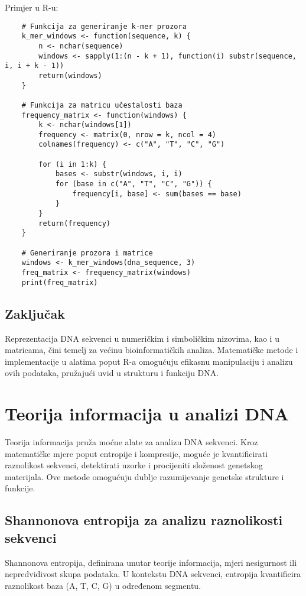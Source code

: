 \documentclass[10pt,a4paper,twoside]{article}
\begin{document}
Primjer u R-u:
\begin{verbatim}
	# Funkcija za generiranje k-mer prozora
	k_mer_windows <- function(sequence, k) {
		n <- nchar(sequence)
		windows <- sapply(1:(n - k + 1), function(i) substr(sequence, i, i + k - 1))
		return(windows)
	}
	
	# Funkcija za matricu učestalosti baza
	frequency_matrix <- function(windows) {
		k <- nchar(windows[1])
		frequency <- matrix(0, nrow = k, ncol = 4)
		colnames(frequency) <- c("A", "T", "C", "G")
		
		for (i in 1:k) {
			bases <- substr(windows, i, i)
			for (base in c("A", "T", "C", "G")) {
				frequency[i, base] <- sum(bases == base)
			}
		}
		return(frequency)
	}
	
	# Generiranje prozora i matrice
	windows <- k_mer_windows(dna_sequence, 3)
	freq_matrix <- frequency_matrix(windows)
	print(freq_matrix)
\end{verbatim}

\subsection*{Zaključak}

Reprezentacija DNA sekvenci u numeričkim i simboličkim nizovima, kao i u matricama, čini temelj za većinu bioinformatičkih analiza. Matematičke metode i implementacije u alatima poput R-a omogućuju efikasnu manipulaciju i analizu ovih podataka, pružajući uvid u strukturu i funkciju DNA.
	
\section*{Teorija informacija u analizi DNA}

Teorija informacija pruža moćne alate za analizu DNA sekvenci. Kroz matematičke mjere poput entropije i kompresije, moguće je kvantificirati raznolikost sekvenci, detektirati uzorke i procijeniti složenost genetskog materijala. Ove metode omogućuju dublje razumijevanje genetske strukture i funkcije.

\subsection*{Shannonova entropija za analizu raznolikosti sekvenci}

Shannonova entropija, definirana unutar teorije informacija, mjeri nesigurnost ili nepredvidivost skupa podataka. U kontekstu DNA sekvenci, entropija kvantificira raznolikost baza (A, T, C, G) u određenom segmentu.
\end{document}
